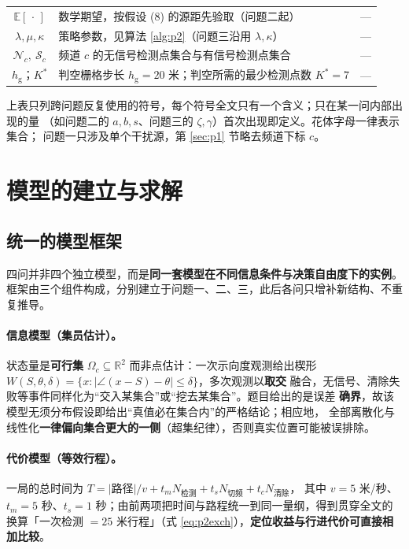 \documentclass[withoutpreface, bwprint]{cumcmthesis}
\newcommand{\symrule}{%
  \arrayrulecolor{black!15}\specialrule{0.3pt}{0.8pt}{0.8pt}\arrayrulecolor{black}}
\begin{document}
\begin{table}[H]
\begin{tabularx}{\textwidth}{cXc}
    $\mathbb{E}[\,\cdot\,]$ & 数学期望，按假设 (8) 的源距先验取（问题二起） & --- \\ \symrule
    $\lambda,\mu,\kappa$ & 策略参数，见算法 \ref{alg:p2}（问题三沿用 $\lambda,\kappa$） & --- \\ \symrule
    $\mathcal{N}_c,\ \mathcal{S}_c$ & 频道 $c$ 的无信号检测点集合与有信号检测点集合 & --- \\ \symrule
    $h_{\mathrm{g}}$；$K^{*}$ & 判空栅格步长 $h_{\mathrm{g}}=20$ 米；判空所需的最少检测点数 $K^{*}=7$ & --- \\
    \bottomrule
  \end{tabularx}
\end{table}

上表只列跨问题反复使用的符号，每个符号全文只有一个含义；只在某一问内部出现的量
（如问题二的 $a,b,s$、问题三的 $\zeta,\gamma$）首次出现即定义。花体字母一律表示集合；
问题一只涉及单个干扰源，第 \ref{sec:p1} 节略去频道下标 $c$。

\section{模型的建立与求解}

\subsection{统一的模型框架}
\label{sec:framework}

四问并非四个独立模型，而是\textbf{同一套模型在不同信息条件与决策自由度下的实例}。
框架由三个组件构成，分别建立于问题一、二、三，此后各问只增补新结构、不重复推导。

\paragraph{信息模型（集员估计）。}
状态量是\textbf{可行集} $\Omega_c\subseteq\mathbb{R}^2$ 而非点估计：一次示向度观测给出楔形
$W(S,\theta,\delta)=\{x:\lvert\angle(x-S)-\theta\rvert\le\delta\}$，多次观测以\textbf{取交}
融合，无信号、清除失败等事件同样化为“交入某集合”或“挖去某集合”。题目给出的是误差
\textbf{确界}，故该模型无须分布假设即给出“真值必在集合内”的严格结论；相应地，
全部离散化与线性化\textbf{一律偏向集合更大的一侧}（超集纪律），否则真实位置可能被误排除。

\paragraph{代价模型（等效行程）。}
一局的总时间为 $T=\lvert\text{路径}\rvert/v+t_m N_{\text{检测}}+t_s N_{\text{切频}}+t_c N_{\text{清除}}$，
其中 $v=5$ 米/秒、$t_m=5$ 秒、$t_s=1$ 秒；由前两项把时间与路程统一到同一量纲，得到贯穿全文的
换算「一次检测 $=25$ 米行程」（式 \eqref{eq:p2exch}），\textbf{定位收益与行进代价可直接相加比较}。
\end{document}
